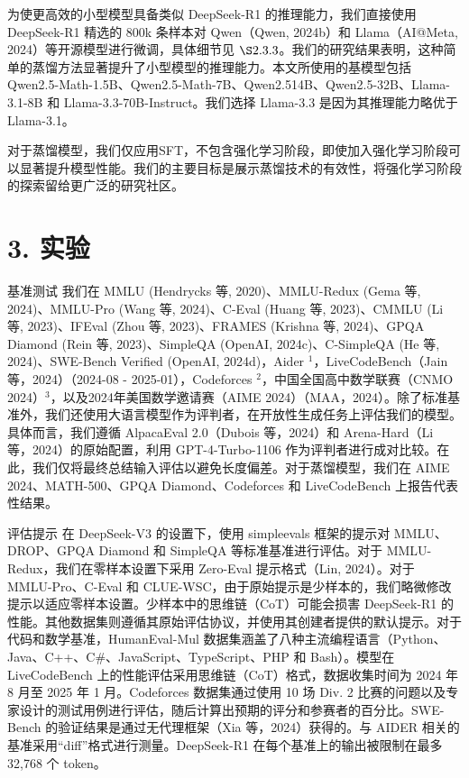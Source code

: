 \documentclass[12pt,a4paper]{report} %
\begin{document}
为使更高效的小型模型具备类似 DeepSeek-R1 的推理能力，我们直接使用 DeepSeek-R1 精选的 800k 条样本对 Qwen（Qwen, 2024b）和 Llama（AI@Meta, 2024）等开源模型进行微调，具体细节见 $\S 2.3.3$。我们的研究结果表明，这种简单的蒸馏方法显著提升了小型模型的推理能力。本文所使用的基模型包括 Qwen2.5-Math-1.5B、Qwen2.5-Math-7B、Qwen2.514B、Qwen2.5-32B、Llama-3.1-8B 和 Llama-3.3-70B-Instruct。我们选择 Llama-3.3 是因为其推理能力略优于 Llama-3.1。


对于蒸馏模型，我们仅应用SFT，不包含强化学习阶段，即使加入强化学习阶段可以显著提升模型性能。我们的主要目标是展示蒸馏技术的有效性，将强化学习阶段的探索留给更广泛的研究社区。


\section*{3. 实验}


基准测试 我们在 MMLU (Hendrycks 等, 2020)、MMLU-Redux (Gema 等, 2024)、MMLU-Pro (Wang 等, 2024)、C-Eval (Huang 等, 2023)、CMMLU (Li 等, 2023)、IFEval (Zhou 等, 2023)、FRAMES (Krishna 等, 2024)、GPQA Diamond (Rein 等, 2023)、SimpleQA (OpenAI, 2024c)、C-SimpleQA (He 等, 2024)、SWE-Bench Verified (OpenAI,
2024d)，Aider ${ }^{1}$，LiveCodeBench（Jain 等，2024）（2024-08 - 2025-01），Codeforces ${ }^{2}$，中国全国高中数学联赛（CNMO 2024）${ }^{3}$，以及2024年美国数学邀请赛（AIME 2024）（MAA，2024）。除了标准基准外，我们还使用大语言模型作为评判者，在开放性生成任务上评估我们的模型。具体而言，我们遵循 AlpacaEval 2.0（Dubois 等，2024）和 Arena-Hard（Li 等，2024）的原始配置，利用 GPT-4-Turbo-1106 作为评判者进行成对比较。在此，我们仅将最终总结输入评估以避免长度偏差。对于蒸馏模型，我们在 AIME 2024、MATH-500、GPQA Diamond、Codeforces 和 LiveCodeBench 上报告代表性结果。


评估提示 在 DeepSeek-V3 的设置下，使用 simpleevals 框架的提示对 MMLU、DROP、GPQA Diamond 和 SimpleQA 等标准基准进行评估。对于 MMLU-Redux，我们在零样本设置下采用 Zero-Eval 提示格式（Lin, 2024）。对于 MMLU-Pro、C-Eval 和 CLUE-WSC，由于原始提示是少样本的，我们略微修改提示以适应零样本设置。少样本中的思维链（CoT）可能会损害 DeepSeek-R1 的性能。其他数据集则遵循其原始评估协议，并使用其创建者提供的默认提示。对于代码和数学基准，HumanEval-Mul 数据集涵盖了八种主流编程语言（Python、Java、C++、C#、JavaScript、TypeScript、PHP 和 Bash）。模型在 LiveCodeBench 上的性能评估采用思维链（CoT）格式，数据收集时间为 2024 年 8 月至 2025 年 1 月。Codeforces 数据集通过使用 10 场 Div. 2 比赛的问题以及专家设计的测试用例进行评估，随后计算出预期的评分和参赛者的百分比。SWE-Bench 的验证结果是通过无代理框架（Xia 等，2024）获得的。与 AIDER 相关的基准采用“diff”格式进行测量。DeepSeek-R1 在每个基准上的输出被限制在最多 32,768 个 token。
\end{document}
